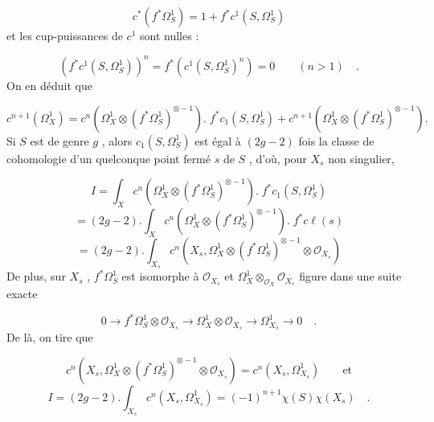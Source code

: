
\begin{equation*}
 c^{*}(f^{*} \Omega^{1}_{S}) = 1 + f^{*}c^{1}(S,\Omega^{1}_{S})
\end{equation*}
et les cup-puissances de $c^{1}$ sont nulles :

\begin{equation*}
(f^{*} c^{1}(S,\Omega^{1}_{S}))^{n} = f^{*}(c^{1}(S,\Omega^{1}_{S})^{n}) = 0 \qquad (n > 1) \quad .
\end{equation*}
On en déduit que

\begin{equation*}
c^{n+1}(\Omega^{1}_{X}) = c^{n}(\Omega^{1}_{X} \otimes (f^{*}\Omega^{1}_{S})^{\otimes -1}) . \; f^{*}c_{1}(S,\Omega^{1}_{S}) + c^{n+1}(\Omega^{1}_{X} \otimes (f^{*} \Omega^{1}_{S})^{\otimes -1}) .
\end{equation*}
Si $S$ est de genre $g$ , alors $c_{1}(S,\Omega^{1}_{S})$ est égal à $(2g - 2)$ fois la classe de cohomologie d'un quelconque point fermé $s$ de $S$ , d'où, pour $X_{s}$ non singulier,

\begin{equation*}
I = \int_{X} c^{n}(\Omega^{1}_{X} \otimes (f^{*} \Omega^{1}_{S})^{\otimes -1}) . \; f^{*}c_{1}(S,\Omega^{1}_{S})
\end{equation*}
\begin{equation*}
= (2g-2) . \int_{X} c^{n}(\Omega^{1}_{X} \otimes (f^{*} \Omega^{1}_{S})^{\otimes -1}) . \; f^{*}c\ell(s)
\end{equation*}
\begin{equation*}
= (2g-2) . \int_{X_{s}} c^{n}(X_{s},\Omega^{1}_{X} \otimes (f^{*} \Omega^{1}_{S})^{\otimes -1} \otimes \mathcal{O}_{X_{s}})
\end{equation*}
De plus, sur $X_{s}$ , $f^{*}\Omega^{1}_{S}$ est isomorphe à $\mathcal{O}_{X_{s}}$ et $\Omega^{1}_{X} \otimes_{\mathcal{O}_{X}} \mathcal{O}_{X_{s}}$ figure dans une suite exacte

\begin{equation*}
0 \to f^{*}\Omega^{1}_{S} \otimes \mathcal{O}_{X_{s}} \to \Omega^{1}_{X} \otimes \mathcal{O}_{X_{s}} \to \Omega^{1}_{X_{s}} \to 0 \quad .
\end{equation*}
De là, on tire que

\begin{equation*}
c^{n}(X_{s},\Omega^{1}_{X} \otimes (f^{*} \Omega^{1}_{S})^{\otimes -1} \otimes \mathcal{O}_{X_{s}}) = c^{n}(X_{s},\Omega^{1}_{X_{s}}) \qquad \mathrm{et}
\end{equation*}
\begin{equation*}
I = (2g-2) . \int_{X_{s}} c^{n}(X_{s},\Omega^{1}_{X_{s}}) = (-1)^{n+1} \chi(S) \chi(X_{s}) \quad .
\end{equation*}

